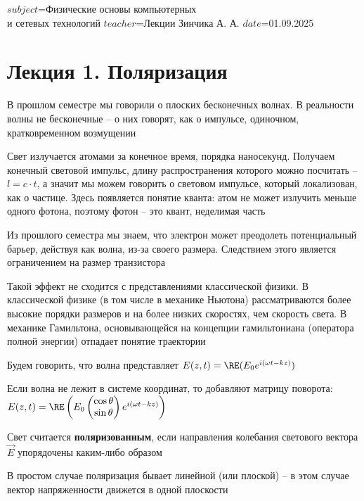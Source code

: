 $subject$=Физические основы компьютерных \\ и сетевых технологий
$teacher$=Лекции Зинчика А. А.
$date$=01.09.2025

\section{Лекция 1. Поляризация}

В прошлом семестре мы говорили о плоских бесконечных волнах. В реальности волны не бесконечные -- о них говорят, как о импульсе, одиночном, кратковременном возмущении

Свет излучается атомами за конечное время, порядка наносекунд. Получаем конечный световой импульс, длину распространения которого можно посчитать -- $l = c \cdot t$, а значит мы можем говорить о световом импульсе, который локализован, как о частице. Здесь появляется понятие кванта: атом не может излучить меньше одного фотона, поэтому фотон -- это квант, неделимая часть

Из прошлого семестра мы знаем, что электрон может преодолеть потенциальный барьер, действуя как волна, из-за своего размера. Следствием этого является ограничением на размер транзистора

Такой эффект не сходится с представлениями классической физики. В классической физике (в том числе в механике Ньютона) рассматриваются более высокие порядки размеров и на более низких скоростях, чем скорость света.
В механике Гамильтона, основывающейся на концепции гамильтониана (оператора полной энергии) отпадает понятие траектории

\mediumvspace

Будем говорить, что волна представляет $E(z, t) = \RE(E_0 e^{i(\omega t - kz)})$

Если волна не лежит в системе координат, то добавляют матрицу поворота: $E(z, t) = \RE\left(E_0 \begin{pmatrix}\cos \theta \\ \sin \theta \end{pmatrix} e^{i(\omega t - kz)}\right)$

\smallvspace

Свет считается \textbf{поляризованным}, если направления колебания светового вектора $\vec E$ упорядочены каким-либо образом


В простом случае поляризация бывает линейной (или плоской) -- в этом случае вектор напряженности движется в одной плоскости

